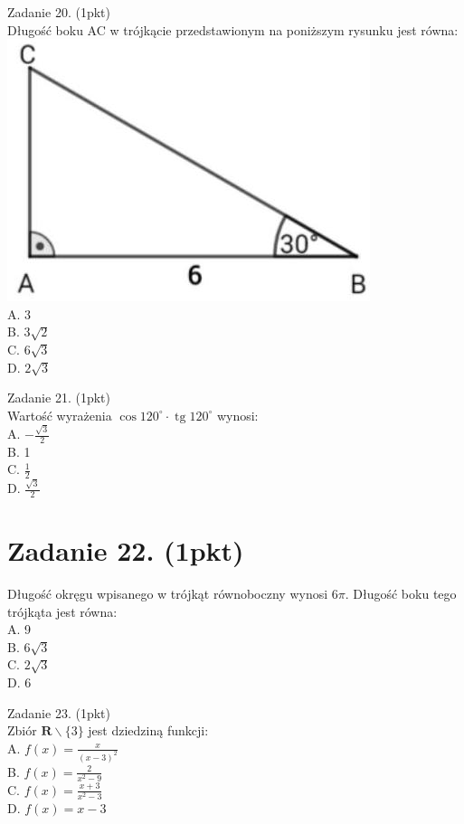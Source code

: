 \documentclass[10pt]{article}
\begin{document}
Zadanie 20. (1pkt)\\
Długość boku AC w trójkącie przedstawionym na poniższym rysunku jest równa:\\
\includegraphics[max width=\textwidth, center]{2024_11_21_0fa17f80dfe1c6bd3b66g-06(1)}\\
A. 3\\
B. \(3 \sqrt{2}\)\\
C. \(6 \sqrt{3}\)\\
D. \(2 \sqrt{3}\)

Zadanie 21. (1pkt)\\
Wartość wyrażenia \(\cos 120^{\circ} \cdot \operatorname{tg} 120^{\circ}\) wynosi:\\
A. \(-\frac{\sqrt{3}}{2}\)\\
B. 1\\
C. \(\frac{1}{2}\)\\
D. \(\frac{\sqrt{3}}{2}\)

\section*{Zadanie 22. (1pkt)}
Długość okręgu wpisanego w trójkąt równoboczny wynosi \(6 \pi\). Długość boku tego trójkąta jest równa:\\
A. 9\\
B. \(6 \sqrt{3}\)\\
C. \(2 \sqrt{3}\)\\
D. 6

Zadanie 23. (1pkt)\\
Zbiór \(\boldsymbol{R} \backslash\{3\}\) jest dziedziną funkcji:\\
A. \(f(x)=\frac{x}{(x-3)^{2}}\)\\
B. \(f(x)=\frac{2}{x^{2}-9}\)\\
C. \(f(x)=\frac{x+3}{x^{2}-3}\)\\
D. \(f(x)=x-3\)
\end{document}
